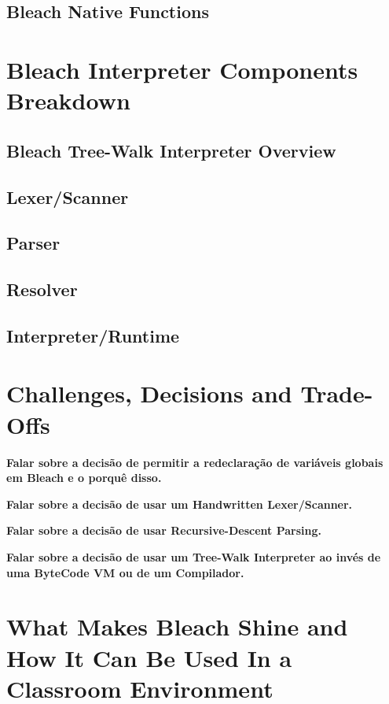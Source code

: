 \subsection{Bleach Native Functions}

\section{Bleach Interpreter Components Breakdown}

\subsection{Bleach Tree-Walk Interpreter Overview}
\subsection{Lexer/Scanner}
\subsection{Parser}
\subsection{Resolver}
\subsection{Interpreter/Runtime}

\section{Challenges, Decisions and Trade-Offs}
\textbf{Falar sobre a decisão de permitir a redeclaração de variáveis globais em Bleach e o porquê disso.}

\textbf{Falar sobre a decisão de usar um Handwritten Lexer/Scanner.}

\textbf{Falar sobre a decisão de usar Recursive-Descent Parsing.}

\textbf{Falar sobre a decisão de usar um Tree-Walk Interpreter ao invés de uma ByteCode VM ou de um Compilador.}


\section{What Makes Bleach Shine and How It Can Be Used In a Classroom Environment}